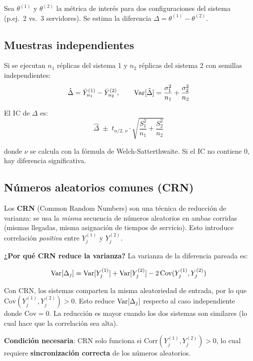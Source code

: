 \documentclass[11pt, letterpaper]{article}
\begin{document}
Sea $\theta^{(1)}$ y $\theta^{(2)}$ la métrica de interés para dos configuraciones del sistema (p.ej.\ 2 vs.\ 3 servidores). Se estima la diferencia $\Delta = \theta^{(1)} - \theta^{(2)}$.

\subsection{Muestras independientes}

Si se ejecutan $n_1$ réplicas del sistema 1 y $n_2$ réplicas del sistema 2 con semillas independientes:
\[
\hat\Delta = \bar Y_{n_1}^{(1)} - \bar Y_{n_2}^{(2)}, \qquad
\operatorname{Var}[\hat\Delta] = \frac{\sigma_1^2}{n_1} + \frac{\sigma_2^2}{n_2}
\]

El IC de $\Delta$ es:
\[
\hat\Delta \;\pm\; t_{\alpha/2,\,\nu} \cdot \sqrt{\frac{S_1^2}{n_1} + \frac{S_2^2}{n_2}}
\]

donde $\nu$ se calcula con la fórmula de Welch-Satterthwaite. Si el IC no contiene 0, hay diferencia significativa.

\subsection{Números aleatorios comunes (CRN)}

Los \textbf{CRN} (Common Random Numbers) son una técnica de reducción de varianza: se usa la \emph{misma} secuencia de números aleatorios en ambas corridas (mismas llegadas, misma asignación de tiempos de servicio). Esto introduce correlación \emph{positiva} entre $Y_j^{(1)}$ y $Y_j^{(2)}$.

\textbf{¿Por qué CRN reduce la varianza?} La varianza de la diferencia pareada es:

\[
\operatorname{Var}[\Delta_j] = \operatorname{Var}[Y_j^{(1)}] + \operatorname{Var}[Y_j^{(2)}] - 2\,\text{Cov}(Y_j^{(1)},Y_j^{(2)})
\]

Con CRN, los sistemas comparten la misma aleatoriedad de entrada, por lo que $\text{Cov}(Y_j^{(1)},Y_j^{(2)}) > 0$. Esto reduce $\operatorname{Var}[\Delta_j]$ respecto al caso independiente donde $\text{Cov} = 0$. La reducción es mayor cuando los dos sistemas son similares (lo cual hace que la correlación sea alta).

\textbf{Condición necesaria}: CRN solo funciona si $\text{Corr}(Y_j^{(1)}, Y_j^{(2)}) > 0$, lo cual requiere \textbf{sincronización correcta} de los números aleatorios.
\end{document}
